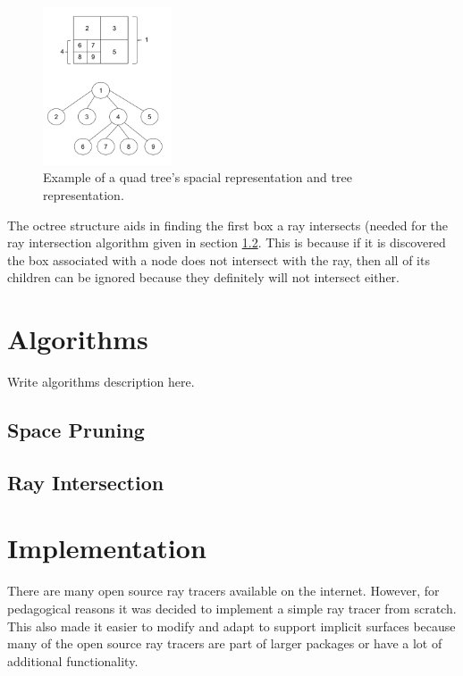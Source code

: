 \documentclass[conference]{acmsiggraph}
\begin{document}
\begin{figure}[ht]
  \centering
  \includegraphics[width=1.5in]{figures/quadtree.png}
  \caption{Example of a quad tree's spacial representation and tree representation.}
  \label{fig:quadtree}
\end{figure}

The octree structure aids in finding the first box a ray intersects (needed 
for the ray intersection algorithm given in section \ref{sec:RayIntersection}.
This is because if it is discovered the box associated with a node does not
intersect with the ray, then all of its children can be ignored because they
definitely will not intersect either.

\section{Algorithms}
\label{sec:Algorithms}

Write algorithms description here.

\subsection{Space Pruning}
\label{sec:SpacePruning}

\subsection{Ray Intersection}
\label{sec:RayIntersection}

\section{Implementation}

There are many open source ray tracers available on the internet.  However, 
for pedagogical reasons it was decided to implement a simple ray tracer from 
scratch.  This also made it easier to modify and adapt to support implicit
surfaces because many of the open source ray tracers are part of larger 
packages or have a lot of additional functionality.
\end{document}
